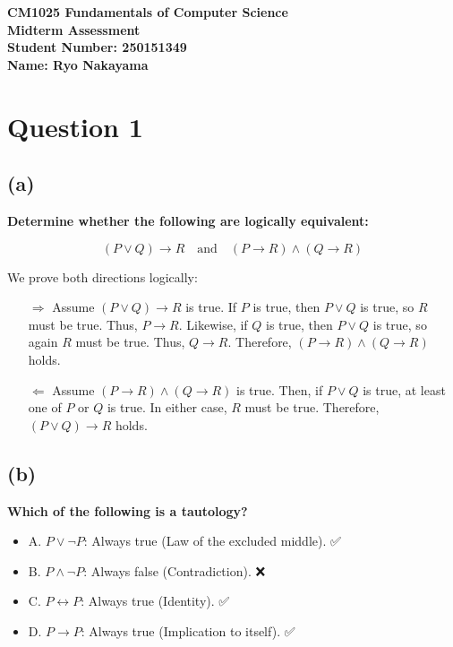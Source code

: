 \documentclass{article}
\begin{document}
\begin{center}
\Large\textbf{CM1025 Fundamentals of Computer Science}\\
\large\textbf{Midterm Assessment}\\
\vspace{0.5cm}
\large\textbf{Student Number: 250151349}\\
\large\textbf{Name: Ryo Nakayama}\\
\vspace{1cm}
\end{center}

\section*{Question 1}

\subsection*{(a)}

\textbf{Determine whether the following are logically equivalent:}

\[
(P \lor Q) \rightarrow R \quad \text{and} \quad (P \rightarrow R) \land (Q \rightarrow R)
\]

We prove both directions logically:

\begin{itemize}
  \item[$\Rightarrow$] Assume \((P \lor Q) \rightarrow R\) is true.  
  If \(P\) is true, then \(P \lor Q\) is true, so \(R\) must be true. Thus, \(P \rightarrow R\).  
  Likewise, if \(Q\) is true, then \(P \lor Q\) is true, so again \(R\) must be true. Thus, \(Q \rightarrow R\).  
  Therefore, \((P \rightarrow R) \land (Q \rightarrow R)\) holds.

  \item[$\Leftarrow$] Assume \((P \rightarrow R) \land (Q \rightarrow R)\) is true.  
  Then, if \(P \lor Q\) is true, at least one of \(P\) or \(Q\) is true.  
  In either case, \(R\) must be true.  
  Therefore, \((P \lor Q) \rightarrow R\) holds.
\end{itemize}

\subsection*{(b)}

\textbf{Which of the following is a tautology?}

\begin{itemize}
  \item A. \(P \lor \neg P\): Always true (Law of the excluded middle). ✅
  \item B. \(P \land \neg P\): Always false (Contradiction). ❌
  \item C. \(P \leftrightarrow P\): Always true (Identity). ✅
  \item D. \(P \rightarrow P\): Always true (Implication to itself). ✅
\end{itemize}
\end{document}
